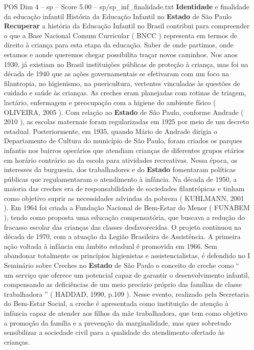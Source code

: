\begin{textsample}{POS Dim 4 – sp – Score 5.00 – sp/sp\_inf\_finalidade.txt}  \label{ex:f4_pos_257}
\textbf{Identidade} e finalidade da educação infantil História da Educação Infantil no \textbf{Estado} de São Paulo \textbf{Recuperar} a história da Educação Infantil no Brasil contribui para compreender o que a Base Nacional Comum Curricular ( BNCC ) representa em termos de direito à criança para esta etapa da educação.
Saber de onde partimos, onde estamos e aonde queremos chegar possibilita traçar novos caminhos.
Nos anos 1930, já existiam no Brasil instituições públicas de proteção à criança, mas foi na década de 1940 que as ações governamentais se efetivaram com um foco na filantropia, no higienismo, na puericultura, vertentes vinculadas às questões de cuidado e saúde às crianças.
As creches eram planejadas com rotinas de triagem, lactário, enfermagem e preocupação com a higiene do ambiente físico ( OLIVEIRA, 2005 ).
Com relação ao \textbf{Estado} de São Paulo, conforme Andrade ( 2010 ), as escolas maternais foram regularizadas em 1925 por meio de um decreto estadual.
Posteriormente, em 1935, quando Mário de Andrade dirigia o Departamento de Cultura do município de São Paulo, foram criados os parques infantis nos bairros operários que atendiam crianças de diferentes grupos etários em horário contrário ao da escola para atividades recreativas.
Nessa época, os interesses da burguesia, dos trabalhadores e do \textbf{Estado} fomentaram políticas públicas que regulamentaram o atendimento à infância.
Na década de 1950, a maioria das creches era de responsabilidade de sociedades filantrópicas e tinham como objetivo suprir as necessidades advindas da pobreza ( KUHLMANN, 2001 ).
Em 1964 foi criada a Fundação Nacional de Bem-Estar do Menor ( FUNABEM ), tendo como proposta uma educação compensatória, que buscava a redução do fracasso escolar das crianças das classes desfavorecidas.
O projeto continuou na década de 1970, com a atuação da Legião Brasileira de Assistência.
A primeira ação voltada à infância em âmbito estadual é promovida em 1966.
Sem abandonar totalmente os princípios higienistas e assistencialistas, é defendido no I Seminário sobre Creches no \textbf{Estado} de São Paulo o conceito de creche como “ um serviço que oferece um potencial capaz de garantir o desenvolvimento infantil, compensando as deficiências de um meio precário próprio das famílias de classe trabalhadora ” ( HADDAD, 1990, p.109 ).
Nesse evento, realizado pela Secretaria do Bem-Estar Social, a creche é apresentada como instituição de atenção à infância capaz de atender aos filhos da mãe trabalhadora, que tem como objetivo a promoção da família e a prevenção da marginalidade, mas quer sobretudo sensibilizar a sociedade civil para a qualidade do atendimento ofertado às crianças.

\end{textsample}
